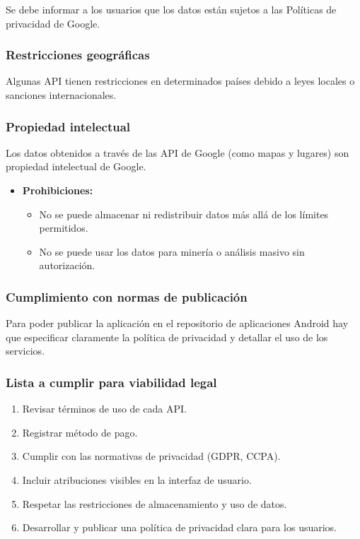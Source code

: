 Se debe informar a los usuarios que los datos están sujetos a las Políticas de privacidad de Google.

\subsubsection{Restricciones geográficas}

Algunas API tienen restricciones en determinados países debido a leyes locales o sanciones internacionales. 


\subsubsection{Propiedad intelectual}

Los datos obtenidos a través de las API de Google (como mapas y lugares) son propiedad intelectual de Google.


\begin{itemize}
	\item \textbf{Prohibiciones:}
	\begin{itemize}
		\item No se puede almacenar ni redistribuir datos más allá de los límites permitidos.
		\item No se puede usar los datos para minería o análisis masivo sin autorización.
	\end{itemize}
\end{itemize}

\subsubsection{Cumplimiento con normas de publicación}

Para poder publicar la aplicación en el repositorio de aplicaciones Android hay que especificar claramente la política de privacidad y detallar el uso de los servicios.


\subsubsection{Lista a cumplir para viabilidad legal}

\begin{enumerate}
	\item Revisar términos de uso de cada API.
	\item Registrar método de pago.
	\item Cumplir con las normativas de privacidad (GDPR, CCPA).
	\item Incluir atribuciones visibles en la interfaz de usuario.
	\item Respetar las restricciones de almacenamiento y uso de datos.
	\item Desarrollar y publicar una política de privacidad clara para los usuarios.
\end{enumerate}
